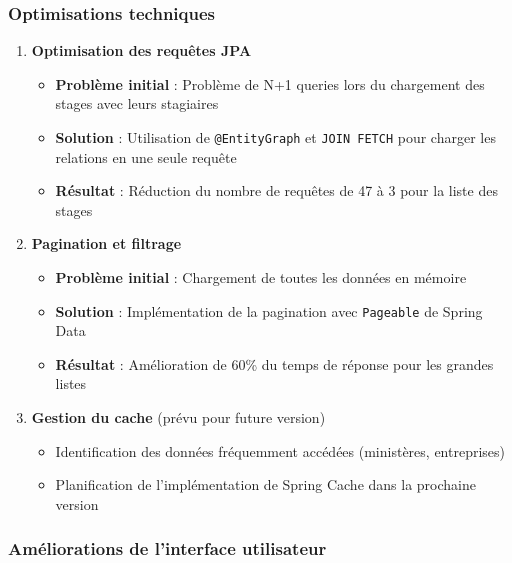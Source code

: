 \documentclass[12pt,a4paper]{report}
\begin{document}
\subsubsection{Optimisations techniques}

\begin{enumerate}[leftmargin=1cm]
    \item \textbf{Optimisation des requêtes JPA}
    \begin{itemize}
        \item \textbf{Problème initial} : Problème de N+1 queries lors du chargement des stages avec leurs stagiaires
        \item \textbf{Solution} : Utilisation de \texttt{@EntityGraph} et \texttt{JOIN FETCH} pour charger les relations en une seule requête
        \item \textbf{Résultat} : Réduction du nombre de requêtes de 47 à 3 pour la liste des stages
    \end{itemize}
    
    \item \textbf{Pagination et filtrage}
    \begin{itemize}
        \item \textbf{Problème initial} : Chargement de toutes les données en mémoire
        \item \textbf{Solution} : Implémentation de la pagination avec \texttt{Pageable} de Spring Data
        \item \textbf{Résultat} : Amélioration de 60\% du temps de réponse pour les grandes listes
    \end{itemize}
    
    \item \textbf{Gestion du cache} (prévu pour future version)
    \begin{itemize}
        \item Identification des données fréquemment accédées (ministères, entreprises)
        \item Planification de l'implémentation de Spring Cache dans la prochaine version
    \end{itemize}
\end{enumerate}

\subsubsection{Améliorations de l'interface utilisateur}
\end{document}
